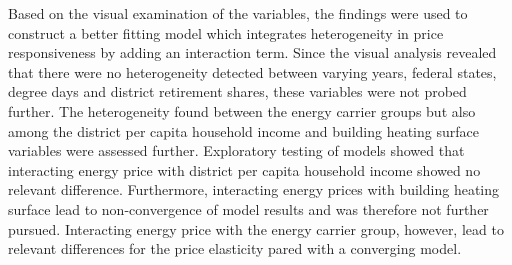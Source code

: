 \documentclass[12pt,twoside]{reedthesis}
\begin{document}
Based on the visual examination of the variables, the findings were used to construct a better fitting model which integrates heterogeneity in price responsiveness by adding an interaction term. Since the visual analysis revealed that there were no heterogeneity detected between varying years, federal states, degree days and district retirement shares, these variables were not probed further. The heterogeneity found between the energy carrier groups but also among the district per capita household income and building heating surface variables were assessed further. Exploratory testing of models showed that interacting energy price with district per capita household income showed no relevant difference. Furthermore, interacting energy prices with building heating surface lead to non-convergence of model results and was therefore not further pursued. Interacting energy price with the energy carrier group, however, lead to relevant differences for the price elasticity pared with a converging model.
\end{document}
